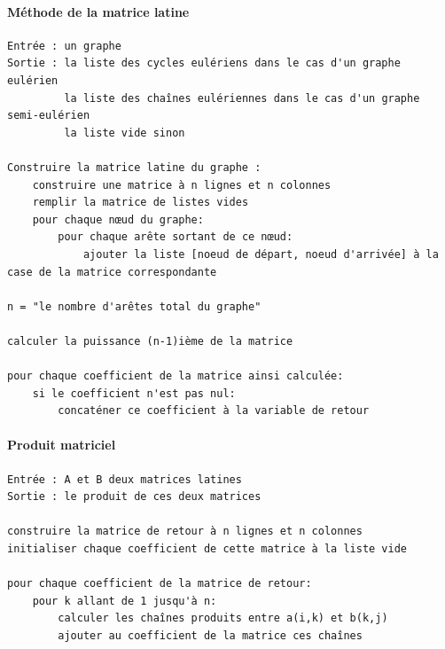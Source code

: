     \paragraph{Méthode de la matrice latine} \mbox{}
      \begin{lstlisting}
Entrée : un graphe
Sortie : la liste des cycles eulériens dans le cas d'un graphe eulérien
         la liste des chaînes eulériennes dans le cas d'un graphe semi-eulérien
         la liste vide sinon

Construire la matrice latine du graphe :
    construire une matrice à n lignes et n colonnes
    remplir la matrice de listes vides
    pour chaque nœud du graphe:
        pour chaque arête sortant de ce nœud:
            ajouter la liste [noeud de départ, noeud d'arrivée] à la case de la matrice correspondante

n = "le nombre d'arêtes total du graphe"

calculer la puissance (n-1)ième de la matrice

pour chaque coefficient de la matrice ainsi calculée:
    si le coefficient n'est pas nul:
        concaténer ce coefficient à la variable de retour
      \end{lstlisting}

    \paragraph{Produit matriciel} \mbox{}
      \begin{lstlisting}
Entrée : A et B deux matrices latines
Sortie : le produit de ces deux matrices

construire la matrice de retour à n lignes et n colonnes
initialiser chaque coefficient de cette matrice à la liste vide

pour chaque coefficient de la matrice de retour:
    pour k allant de 1 jusqu'à n:
        calculer les chaînes produits entre a(i,k) et b(k,j)
        ajouter au coefficient de la matrice ces chaînes 
      \end{lstlisting}

